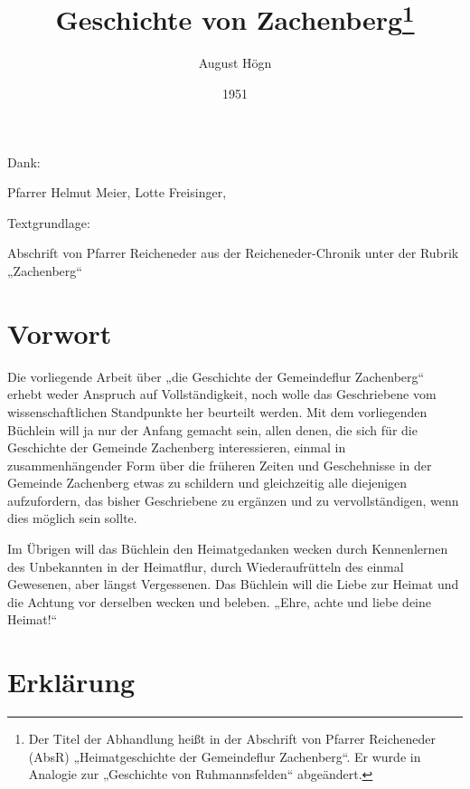 \documentclass{book}
\author{August Högn}
\title{Geschichte von Zachenberg\footnote{Der Titel der Abhandlung heißt in der
Abschrift von Pfarrer Reicheneder (AbsR) „Heimatgeschichte der Gemeindeflur
Zachenberg“. Er wurde in Analogie zur „Geschichte von Ruhmannsfelden“
abgeändert.}}
\date{1951}
\begin{document}
\maketitle

\begin{ersteseite}
Dank:

\bigskip

Pfarrer Helmut Meier, Lotte Freisinger,

\bigskip

Textgrundlage:

\bigskip

Abschrift von Pfarrer Reicheneder aus der Reicheneder-Chronik unter der
Rubrik „Zachenberg“

\end{ersteseite}

\tableofcontents

\newpage

\part{Vorwort}

Die vorliegende Arbeit über „die Geschichte der Gemeindeflur Zachenberg“
erhebt weder Anspruch auf Vollständigkeit, noch wolle das Geschriebene
vom wissenschaftlichen Standpunkte her beurteilt werden. Mit dem
vorliegenden Büchlein will ja nur der Anfang gemacht sein, allen denen,
die sich für die Geschichte der Gemeinde Zachenberg interessieren,
einmal in zusammenhängender Form über die früheren Zeiten und
Geschehnisse in der Gemeinde Zachenberg etwas zu schildern und
gleichzeitig alle diejenigen aufzufordern, das bisher Geschriebene zu
ergänzen und zu vervollständigen, wenn dies möglich sein sollte.

Im Übrigen will das Büchlein den Heimatgedanken wecken durch
Kennenlernen des Unbekannten in der Heimatflur, durch Wiederaufrütteln
des einmal Gewesenen, aber längst Vergessenen. Das Büchlein will die
Liebe zur Heimat und die Achtung vor derselben wecken und beleben.
„Ehre, achte und liebe deine Heimat!“

\part{Erklärung}
\end{document}

